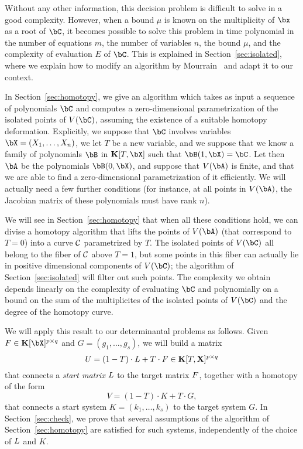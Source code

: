 \documentclass[12pt]{article}
\begin{document}
Without any other information, this decision problem is difficult to
solve in a good complexity. However, when a bound $\mu$ is known on
the multiplicity of $\bx$ as a root of $\bC$, it becomes possible to
solve this problem in time polynomial in the number of equations $m$,
the number of variables $n$, the bound $\mu$, and the complexity of
evaluation $E$ of $\bC$. This is explained in
Section~\ref{sec:isolated}, where we explain how to modify an algorithm
by Mourrain~\cite{Mourrain97} and adapt it to our context.

In Section~\ref{sec:homotopy}, we give an algorithm which takes as
input a sequence of polynomials $\bC$ and computes a zero-dimensional
parametrization of the isolated points of $V(\bC)$, assuming the
existence of a suitable homotopy deformation. Explicitly, we suppose
that $\bC$ involves variables $\bX=(X_1,\dots,X_n)$, we let $T$ be a
new variable, and we suppose that we know a family of polynomials
$\bB$ in $\KK[T,\bX]$ such that $\bB(1,\bX)=\bC$. Let then $\bA$ be
the polynomials $\bB(0,\bX)$, and suppose that $V(\bA)$ is finite, and
that we are able to find a zero-dimensional parametrization of it
efficiently. We will actually need a few further conditions (for
instance, at all points in $V(\bA)$, the Jacobian matrix of these
polynomials must have rank $n$).

We will see in Section~\ref{sec:homotopy} that when all these
conditions hold, we can divise a homotopy algorithm that lifts the
points of $V(\bA)$ (that correspond to $T=0$) into a curve $\cal C$
parametrized by $T$. The isolated points of $V(\bC)$ all belong to the
fiber of $\cal C$ above $T=1$, but some points in this fiber can actually
lie in positive dimensional components of $V(\bC)$; the algorithm of
Section~\ref{sec:isolated} will filter out such points. The complexity
we obtain depends linearly on the complexity of evaluating $\bC$ and
polynomially on a bound on the sum of the multiplicites of the
isolated points of $V(\bC)$ and the degree of the homotopy curve.

We will apply this result to our determinantal problems as
follows. Given $\mF \in \KK[\bX]^{p \times q}$ and $G=(g_1,\dots,g_s)$,
we will build a matrix
\[{U} = (1-T)\cdot {L} + T \cdot {F} \in \mathbf{K}[T, \mathbf{X}]^{p \times q}\]
that connects a \emph{start matrix} ${L}$ to the target matrix ${F}$,
together with a homotopy of the form
\[V = (1-T) \cdot K + T \cdot G,\]
that connects a start system $K=(k_1,\dots,k_s)$ to the target system
$G$.  In Section~\ref{sec:check}, we prove that several assumptions of
the algorithm of Section~\ref{sec:homotopy} are satisfied for such
systems, independently of the choice of ${L}$ and $K$.
\end{document}

